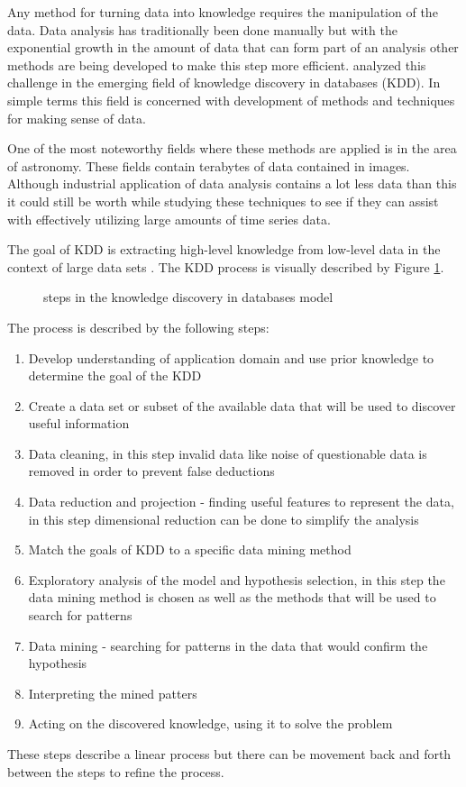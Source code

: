 Any method for turning data into knowledge requires the manipulation of the data. Data analysis has traditionally been done manually but with the exponential growth in the amount of data that can form part of an analysis other methods are being developed to make this step more efficient. \cite{fayyad1996data} analyzed this challenge in the emerging field of knowledge discovery in databases (KDD). In simple terms this field is concerned with development of methods and techniques for making sense of data.


One of the most noteworthy fields where these methods are applied is in the area of astronomy. These fields contain terabytes of data contained in images. Although industrial application of data analysis contains a lot less data than this it could still be worth while studying these techniques to see if they can assist with effectively utilizing large amounts of time series data.

The goal of KDD is extracting high-level knowledge from low-level data in the context of large data sets \cite{fayyad1996data}. The KDD process is visually described by Figure \ref{fig:6}.
\begin{figure}[!ht]
	\centering{}
	\caption{\cite{fayyad1996data} steps in the knowledge discovery in databases model}\label{fig:6}
\end{figure}
The process is described by the following steps:
\begin{enumerate}
	\item Develop understanding of application domain and use prior knowledge to determine the goal of the KDD
	\item Create a data set or subset of the available data that will be used to discover useful information
	\item Data cleaning, in this step invalid data like noise of questionable data is removed in order to prevent false deductions
	\item Data reduction and projection - finding useful features to represent the data, in this step dimensional reduction can be done to simplify the analysis
	\item Match the goals of KDD to a specific data mining method
	\item Exploratory analysis of the model and hypothesis selection, in this step the data mining method is chosen as  well as the methods that will be used to search for patterns
	\item Data mining - searching for patterns in the data that would confirm the hypothesis
	\item Interpreting the mined patters
	\item Acting on the discovered knowledge, using it to solve the problem
\end{enumerate}
These steps describe a linear process but there can be movement back and forth between the steps to refine the process.


